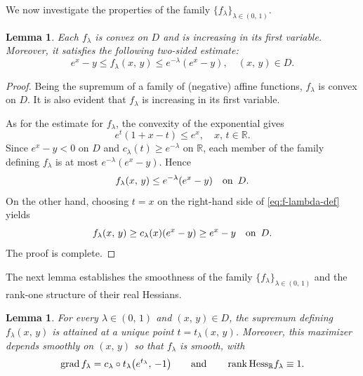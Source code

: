 \documentclass[12pt,a4paper]{amsart}
\numberwithin{equation}{section}
\newtheorem{lemma}[theorem]{Lemma}
\theoremstyle{definition}
\DeclareMathOperator{\rank}{rank}
\begin{document}
We now investigate the properties of the family $\{f_{\lambda}\}_{\lambda\in(0,\, 1)}$.

\begin{lemma}\label{lem:global-estimates}
Each $f_{\lambda}$ is convex on $D$ and is increasing in its first variable. Moreover, it satisfies the following two-sided estimate:
  $$
  e^{x}-y \leq f_{\lambda}(x,\, y) \leq e^{-\lambda}(e^{x}-y),   \quad (x,\, y)\in D.
  $$
\end{lemma}

\begin{proof}
Being the supremum of a family of (negative) affine functions, $f_{\lambda}$ is convex on $D$. It is also evident that $f_{\lambda}$ is increasing in its first variable.

As for the estimate for  $f_{\lambda}$, the convexity of the exponential gives
   $$
    e^t(1+x-t)\leq e^x,  \quad x,\, t\in\mathbb R.
   $$
Since $e^x-y<0$ on $D$ and $c_{\lambda}(t)\geq e^{-\lambda}$ on $\mathbb R$, each member of the family defining $f_{\lambda}$ is at most $e^{-\lambda}(e^x-y)$. Hence
   $$
   f_{\lambda}(x,\, y) \leq e^{-\lambda}(e^{x}-y) \quad {\rm on }\ \, D.
   $$
On the other hand, choosing $t=x$ on the right-hand side of \eqref{eq:f-lambda-def} yields
   $$
   f_{\lambda}(x,\, y) \geq c_{\lambda}(x)(e^x-y) \geq e^x-y   \quad {\rm on }\ \, D.
   $$
The proof is complete.
\end{proof}

The next lemma establishes the smoothness of the family $\{f_{\lambda}\}_{\lambda\in(0,\, 1)}$ and the rank-one structure of their real Hessians.

\begin{lemma}\label{lem:unique-maximizer} For every $\lambda\in(0,\, 1)$ and $(x,\, y)\in D$, the supremum defining $f_{\lambda}(x,\,y)$ is attained at a unique point $t=t_{\lambda}(x,\,y)$. Moreover, this maximizer depends smoothly on $(x,\, y)$  so that $f_{\lambda}$ is
smooth, with
   $$
   {\rm grad}\, f_{\lambda}=c_{\lambda}\circ t_{\lambda} \bigl(e^{t_{\lambda}},\, -1\bigr)
   \qquad {\rm and } \qquad  \rank {\rm Hess}_{\mathbb R}f_{\lambda}\equiv 1.
   $$
\end{lemma}
\end{document}
